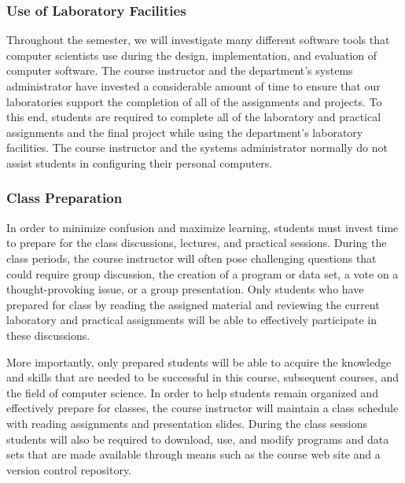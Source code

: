 \subsubsection*{Use of Laboratory Facilities}

Throughout the semester, we will investigate many different software tools that computer scientists use during the
design, implementation, and evaluation of computer software.  The course instructor and the department's systems
administrator have invested a considerable amount of time to ensure that our laboratories support the completion of all
of the assignments and projects.  To this end, students are required to complete all of the laboratory and practical
assignments and the final project while using the department's laboratory facilities. The course instructor and the
systems administrator normally do not assist students in configuring their personal computers.

\subsubsection*{Class Preparation}


In order to minimize confusion and maximize learning, students must invest time to prepare for the class discussions,
lectures, and practical sessions.  During the class periods, the course instructor will often pose challenging questions
that could require group discussion, the creation of a program or data set, a vote on a thought-provoking issue, or a
group presentation.  Only students who have prepared for class by reading the assigned material and reviewing the
current laboratory and practical assignments will be able to effectively participate in these discussions.

More importantly, only prepared students will be able to acquire the knowledge and skills that are needed to be
successful in this course, subsequent courses, and the field of computer science.  In order to help students remain
organized and effectively prepare for classes, the course instructor will maintain a class schedule with reading
assignments and presentation slides.   During the class sessions students will also be required to download, use, and
modify programs and data sets that are made available through means such as the course web site and a version control
repository.

